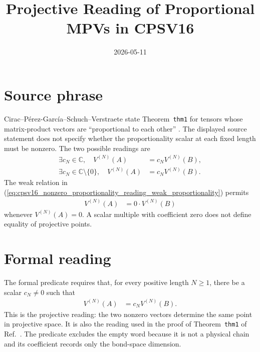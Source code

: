 \documentclass{article}
\title{Projective Reading of Proportional MPVs in CPSV16}
\author{}
\date{2026-05-11}
\begin{document}
\maketitle
{}

\section{Source phrase}

Cirac--P\'erez-Garc\'ia--Schuch--Verstraete state
Theorem~\texttt{thm1} for tensors whose matrix-product vectors are
``proportional to each other''
\cite[lines~1167--1170]{Cirac2016MPDO_arXiv}. The displayed source statement
does not specify whether the proportionality scalar at each fixed length must
be nonzero. The two possible readings are
\begin{align}
    \exists c_N\in\mathbb C,\quad
    V^{(N)}(A)
        &=c_NV^{(N)}(B),
    \label{eq:cpsv16_nonzero_proportionality_reading_weak_proportionality}\\
    \exists c_N\in\mathbb C\setminus\{0\},\quad
    V^{(N)}(A)
        &=c_NV^{(N)}(B).
    \label{eq:cpsv16_nonzero_proportionality_reading_projective_proportionality}
\end{align}
The weak relation in
(\ref{eq:cpsv16_nonzero_proportionality_reading_weak_proportionality}) permits
\begin{align}
    V^{(N)}(A)
        &=0\cdot V^{(N)}(B)
    \label{eq:cpsv16_nonzero_proportionality_reading_zero_scalar}
\end{align}
whenever $V^{(N)}(A)=0$. A scalar multiple with coefficient zero does not
define equality of projective points.

\section{Formal reading}

The formal predicate
 requires that, for every
positive length $N\geq 1$, there be a scalar $c_N\neq 0$ such that
\begin{align}
    V^{(N)}(A)
        &=c_NV^{(N)}(B).
    \label{eq:cpsv16_nonzero_proportionality_reading_formal_relation}
\end{align}
This is the projective reading: the two nonzero vectors determine the same
point in projective space. It is also the reading used in the proof of
Theorem~\texttt{thm1} of Ref.~\cite{Cirac2016MPDO_arXiv}. The predicate
excludes the empty word because it is not a physical chain and its coefficient
records only the bond-space dimension.
\end{document}
